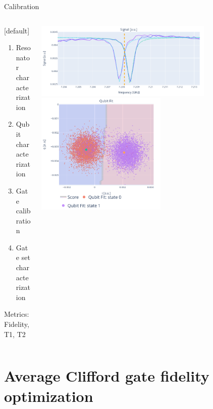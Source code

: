 \documentclass[aspectratio=169,10pt]{beamer}
\begin{document}
\begin{frame}{Calibration}
  \begin{columns}
    \begin{column}{0.45\textwidth}
      {[default]
      \begin{enumerate}[leftmargin=*, label=\arabic*.]
        \item Resonator characterization
        \item Qubit characterization
        \item Gate calibration
        \item Gate set characterization
      \end{enumerate}}
      \vspace{1em}
      Metrics: Fidelity, T1, T2
    \end{column}
    \begin{column}{0.55\textwidth}
      \centering
      \includegraphics[width=0.75\textwidth]{figures/disp_sihft.png}
      \includegraphics[width=0.55\textwidth]{figures/classification.png}
    \end{column}
  \end{columns}

\end{frame}

\section{Average Clifford gate fidelity optimization}
\end{document}
